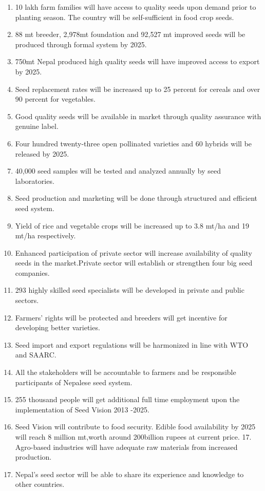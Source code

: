 \documentclass[
  openany]{book}
\providecommand{\tightlist}{%
  \setlength{\itemsep}{0pt}\setlength{\parskip}{0pt}}
\begin{document}
\begin{enumerate}
\def\labelenumi{\arabic{enumi}.}
\tightlist
\item
  10 lakh farm families will have access to quality seeds upon demand prior to planting season. The country will be self-sufficient in food crop seeds.
\item
  88 mt breeder, 2,978mt foundation and 92,527 mt improved seeds will be produced through formal system by 2025.
\item
  750mt Nepal produced high quality seeds will have improved access to export by 2025.
\item
  Seed replacement rates will be increased up to 25 percent for cereals and over 90 percent for vegetables.
\item
  Good quality seeds will be available in market through quality assurance with genuine label.
\item
  Four hundred twenty-three open pollinated varieties and 60 hybrids will be released by 2025.
\item
  40,000 seed samples will be tested and analyzed annually by seed laboratories.
\item
  Seed production and marketing will be done through structured and efficient seed system.
\item
  Yield of rice and vegetable crops will be increased up to 3.8 mt/ha and 19 mt/ha respectively.
\item
  Enhanced participation of private sector will increase availability of quality seeds in the market.Private sector will establish or strengthen four big seed companies.
\item
  293 highly skilled seed specialists will be developed in private and public sectors.
\item
  Farmers' rights will be protected and breeders will get incentive for developing better varieties.
\item
  Seed import and export regulations will be harmonized in line with WTO and SAARC.
\item
  All the stakeholders will be accountable to farmers and be responsible participants of Nepalese seed system.
\item
  255 thousand people will get additional full time employment upon the implementation of Seed Vision 2013 -2025.
\item
  Seed Vision will contribute to food security. Edible food availability by 2025 will reach 8 million mt,worth around 200billion rupees at current price. 17. Agro-based industries will have adequate raw materials from increased production.
\item
  Nepal's seed sector will be able to share its experience and knowledge to other countries.
\end{enumerate}
\end{document}
